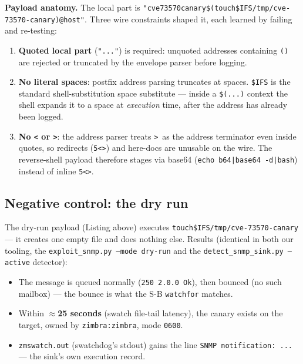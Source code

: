 \documentclass[journal]{IEEEtran}
\begin{document}
\textbf{Payload anatomy.} The local part is
\texttt{"cve73570canary\$(touch\${IFS}/\hspace{0pt}tmp/cve-73570-canary)@host"}. Three
wire constraints shaped it, each learned by failing and re-testing:
\begin{enumerate}
\item \textbf{Quoted local part} (\texttt{"..."}) is required: unquoted
      addresses containing \texttt{()} are rejected or truncated by the
      envelope parser before logging.
\item \textbf{No literal spaces}: postfix address parsing truncates at
      spaces. \texttt{\${IFS}} is the standard shell-substitution space
      substitute — inside a \texttt{\$(...)} context the shell expands it to
      a space at \emph{execution} time, after the address has already been
      logged.
\item \textbf{No \texttt{<} or \texttt{>}}: the address parser treats
      \texttt{>}\ as the address terminator even inside quotes, so
      redirects (\texttt{5<>}) and here-docs are unusable on the wire. The
      reverse-shell payload therefore stages via base64
      (\texttt{echo b64|base64 -d|bash}) instead of inline \texttt{5<>}.
\end{enumerate}

\subsection{Negative control: the dry run}

The dry-run payload (Listing above) executes
\texttt{touch\${IFS}/tmp/cve-73570-canary} — it creates one empty file and
does nothing else. Results (identical in both our tooling, the
\texttt{exploit\_snmp.py --mode dry-run} and the
\texttt{detect\_snmp\_sink.py --active} detector):

\begin{itemize}
\item The message is queued normally (\texttt{250 2.0.0 Ok}), then bounced
      (no such mailbox) — the bounce is what the S-B \texttt{watchfor}
      matches.
\item Within \textbf{$\approx$25 seconds} (swatch file-tail latency), the
      canary exists on the target, owned by \texttt{zimbra:zimbra}, mode
      \texttt{0600}.
\item \texttt{zmswatch.out} (swatchdog's stdout) gains the line
      \texttt{SNMP notification: ...} — the sink's own execution record.
\end{itemize}
\end{document}
